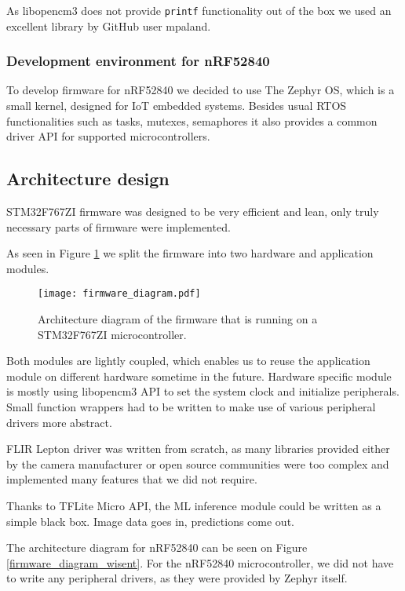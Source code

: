 As libopencm3 does not provide \verb|printf| functionality out of the box we used an excellent library by GitHub user mpaland\cite{printf_lib}.


\subsubsection{ Development environment for nRF52840}

To develop firmware for nRF52840 we decided to use The Zephyr OS, which is a small kernel, designed for IoT embedded systems.
Besides usual RTOS functionalities such as tasks, mutexes, semaphores it also provides a common driver API for supported microcontrollers.


\subsection{ Architecture design}

STM32F767ZI firmware was designed to be very efficient and lean, only truly necessary parts of firmware were implemented.

As seen in Figure \ref{firmware_diagram} we split the firmware into two hardware and application modules.

\begin{figure}[ht]
        \centering
        \texttt{[image: firmware\_diagram.pdf]} 
        \caption{ Architecture diagram of the firmware that is running on a STM32F767ZI microcontroller.} 
        \label{firmware_diagram}
\end{figure}

Both modules are lightly coupled, which enables us to reuse the application module on different hardware sometime in the future.
Hardware specific module is mostly using libopencm3 API to set the system clock and initialize peripherals.
Small function wrappers had to be written to make use of various peripheral drivers more abstract.

FLIR Lepton driver was written from scratch, as many libraries provided either by the camera manufacturer or open source communities were too complex and implemented many features that we did not require.

Thanks to TFLite Micro API, the ML inference module could be written as a simple black box.
Image data goes in, predictions come out.

The architecture diagram for nRF52840 can be seen on Figure \ref{firmware_diagram_wisent}.
For the nRF52840 microcontroller, we did not have to write any peripheral drivers, as they were provided by Zephyr itself.


